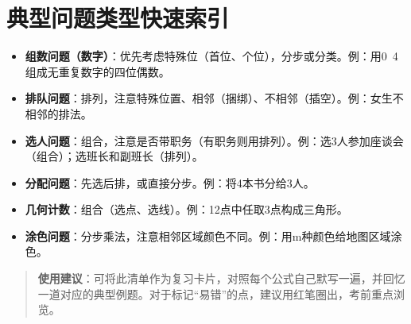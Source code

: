 \documentclass[10pt]{article}
\begin{document}
\section{典型问题类型快速索引}

\begin{itemize}
\item \textbf{组数问题（数字）}：优先考虑特殊位（首位、个位），分步或分类。例：用0~4组成无重复数字的四位偶数。
\item \textbf{排队问题}：排列，注意特殊位置、相邻（捆绑）、不相邻（插空）。例：女生不相邻的排法。
\item \textbf{选人问题}：组合，注意是否带职务（有职务则用排列）。例：选3人参加座谈会（组合）；选班长和副班长（排列）。
\item \textbf{分配问题}：先选后排，或直接分步。例：将4本书分给3人。
\item \textbf{几何计数}：组合（选点、选线）。例：12点中任取3点构成三角形。
\item \textbf{涂色问题}：分步乘法，注意相邻区域颜色不同。例：用m种颜色给地图区域涂色。
\end{itemize}

\begin{quote}
\textbf{使用建议}：可将此清单作为复习卡片，对照每个公式自己默写一遍，并回忆一道对应的典型例题。对于标记“易错”的点，建议用红笔圈出，考前重点浏览。
\end{quote}
\end{document}
